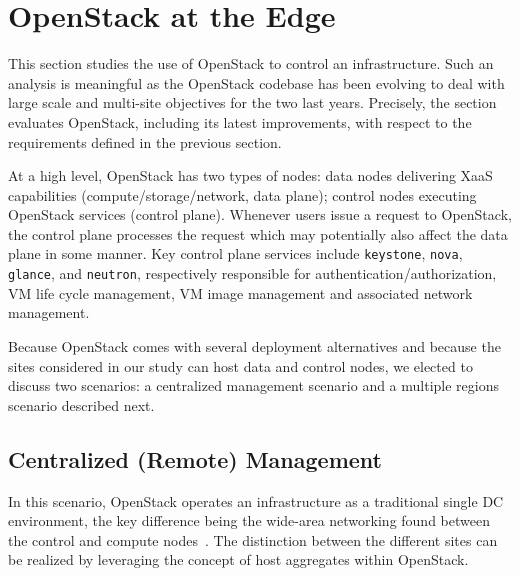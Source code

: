 \vspace*{-.1cm}
\section{OpenStack at the Edge}
\label{sec:system_design_considerations}
\vspace*{-.1cm}

%
This section studies the use of OpenStack to control an \edge
infrastructure. Such an analysis is meaningful as the OpenStack
codebase has been evolving to deal with large scale and multi-site
objectives for the two last years. Precisely, the section evaluates
OpenStack, including its latest improvements, with respect to the requirements
defined in the previous section.


At a high level, OpenStack has two types of nodes: data nodes
delivering XaaS capabilities (compute/storage/network, \ie data
plane); control nodes executing OpenStack services (\ie control
plane). Whenever users issue a request to OpenStack, the control
plane processes the request which may potentially also affect the data plane in some manner. 
Key control plane services include \verb|keystone|,
\verb|nova|, \verb|glance|, and \verb|neutron|, respectively responsible for 
authentication/authorization, VM life cycle management, VM image management and
associated network management.

Because OpenStack comes with several deployment alternatives and
because the \edge sites considered in our study can host data and
control nodes, we elected to discuss two scenarios:
a centralized management scenario and a multiple regions scenario described next.

\vspace*{-.3cm}
\subsection{Centralized (Remote) Management}
\label{subsec:centralized_os}
In this scenario, OpenStack operates an \edge infrastructure
as a traditional single DC environment, %
the key difference being the wide-area networking found between the
control and compute nodes~\cite{www:openstack-wanwide}. The
distinction between the different \edge sites can be realized by leveraging the
concept of host aggregates within OpenStack.


